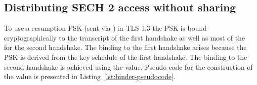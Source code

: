 


\subsection{Distributing SECH 2 access without sharing }

To use a resumption \ac{PSK} (sent via ) in TLS 1.3 the PSK
is bound cryptographically to the transcript of the first handshake as well as most of the  for the second handshake.
The binding to the first handshake arises because the \ac{PSK} is derived from the key schedule
of the first handshake.
The binding to the second handshake is achieved using the  value.
Pseudo-code for the construction of the  value is presented in Listing~\ref{lst:binder-pseudocode}.

